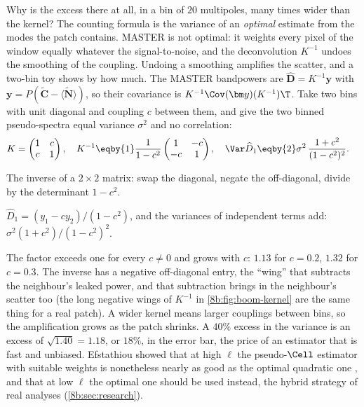 Why is the excess there at all, in a bin of $20$ multipoles, many times wider than the kernel? The
counting formula is the variance of an \emph{optimal} estimate from the modes the patch contains. MASTER
is not optimal: it weights every pixel of the window equally whatever the signal-to-noise, and the
deconvolution $K^{-1}$ undoes the smoothing of the coupling. Undoing a smoothing amplifies the
scatter, and a two-bin toy shows by how much. The MASTER bandpowers are $\widehat{\bm D}=K^{-1}\bm y$ with
$\bm y=P(\widetilde{\bm C}-\langle\widetilde{\bm N}\rangle)$, so their covariance is $K^{-1}\Cov(\bm y)(K^{-1})\T$. Take two bins with
unit diagonal and coupling $c$ between them, and give the two binned pseudo-spectra equal variance
$\sigma^2$ and no correlation:
\begin{align*}
  K=\begin{pmatrix}1&c\\c&1\end{pmatrix},\quad
  K^{-1}&\eqby{1}\frac1{1-c^2}\begin{pmatrix}1&-c\\-c&1\end{pmatrix},\quad
  \Var\widehat D_1\eqby{2}\sigma^2\,\frac{1+c^2}{(1-c^2)^2} .
\end{align*}
\begin{explain}
  \item The inverse of a $2\times2$ matrix: swap the diagonal, negate the off-diagonal, divide by the
        determinant $1-c^2$.
  \item $\widehat D_1=(y_1-cy_2)/(1-c^2)$, and the variances of independent terms add: $\sigma^2(1+c^2)/(1-c^2)^2$.
\end{explain}
The factor exceeds one for every $c\neq0$ and grows with $c$: $1.13$ for $c=0.2$, $1.32$ for $c=0.3$. The inverse
has a negative off-diagonal entry, the ``wing'' that subtracts the neighbour's leaked power, and that
subtraction brings in the neighbour's scatter too (the long negative wings of $K^{-1}$ in
\cref{8b:fig:boom-kernel} are the same thing for a real patch). A wider kernel means larger couplings
between bins, so the amplification grows as the patch shrinks. A $40\%$ excess in the variance is an
excess of $\sqrt{1.40}=1.18$, or $18\%$, in the error bar, the price of an estimator that is fast and
unbiased. Efstathiou showed that at high $\ell$ the
pseudo-$\Cell$ estimator with suitable weights is nonetheless nearly as good as the optimal quadratic one
\cite[§§3--5]{Efstathiou2004}, and that at low $\ell$ the optimal one should be used instead, the hybrid
strategy of real analyses (\cref{8b:sec:research}).

